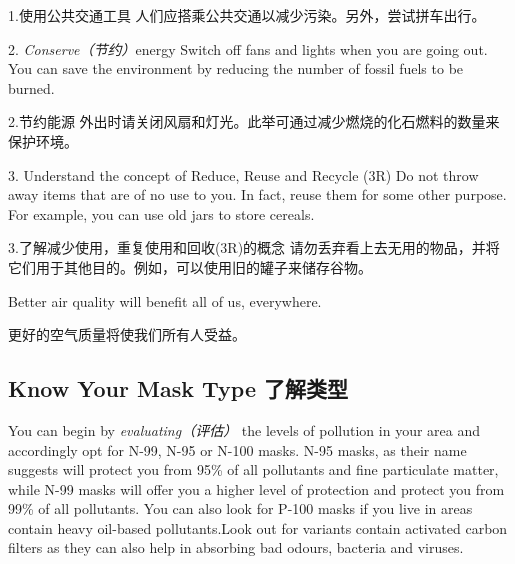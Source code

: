 \begin{multicols}{3}
1.使用公共交通工具
人们应搭乘公共交通以减少污染。另外，尝试拼车出行。

2. \textit{Conserve（节约）}energy Switch off fans and lights when you are going out. You can save the environment by reducing the number of fossil fuels to be burned.

2.节约能源
外出时请关闭风扇和灯光。此举可通过减少燃烧的化石燃料的数量来保护环境。

3. Understand the concept of Reduce, Reuse and Recycle (3R)
Do not throw away items that are of no use to you. In fact, reuse them for some other purpose. For example, you can use old jars to store cereals.

3.了解减少使用，重复使用和回收(3R)的概念
请勿丢弃看上去无用的物品，并将它们用于其他目的。例如，可以使用旧的罐子来储存谷物。

Better air quality will benefit all of us, everywhere.

更好的空气质量将使我们所有人受益。


\subsection*{Know Your Mask Type 了解类型}

You can begin by \textit{evaluating（评估）} the levels of pollution in your area and accordingly opt for N-99, N-95 or N-100 masks. N-95 masks, as their name suggests will protect you from 95\% of all pollutants and fine particulate matter, while N-99 masks will offer you a higher level of protection and protect you from 99\% of all pollutants. You can also look for P-100 masks if you live in areas contain heavy oil-based pollutants.Look out for variants contain activated carbon filters as they can also help in absorbing bad odours, bacteria and viruses.




\end{multicols}
